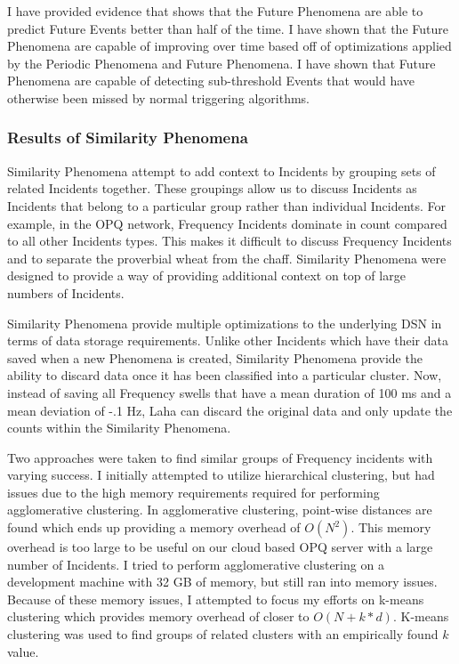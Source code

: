 I have provided evidence that shows that the Future Phenomena are able to predict Future Events better than half of the time. I have shown that the Future Phenomena are capable of improving over time based off of optimizations applied by the Periodic Phenomena and Future Phenomena. I have shown that Future Phenomena are capable of detecting sub-threshold Events that would have otherwise been missed by normal triggering algorithms.

\subsubsection{Results of Similarity Phenomena}

Similarity Phenomena attempt to add context to Incidents by grouping sets of related Incidents together. These groupings allow us to discuss Incidents as Incidents that belong to a particular group rather than individual Incidents. For example, in the OPQ network, Frequency Incidents dominate in count compared to all other Incidents types. This makes it difficult to discuss Frequency Incidents and to separate the proverbial wheat from the chaff. Similarity Phenomena were designed to provide a way of providing additional context on top of large numbers of Incidents.

Similarity Phenomena provide multiple optimizations to the underlying DSN in terms of data storage requirements. Unlike other Incidents which have their data saved when a new Phenomena is created, Similarity Phenomena provide the ability to discard data once it has been classified into a particular cluster. Now, instead of saving all Frequency swells that have a mean duration of 100 ms and a mean deviation of -.1 Hz, Laha can discard the original data and only update the counts within the Similarity Phenomena.

Two approaches were taken to find similar groups of Frequency incidents with varying success. I initially attempted to utilize hierarchical clustering\cite{johnson1967hierarchical}, but had issues due to the high memory requirements required for performing agglomerative clustering. In agglomerative clustering, point-wise distances are found which ends up providing a memory overhead of $O(N^2)$. This memory overhead is too large to be useful on our cloud based OPQ server with a large number of Incidents. I tried to perform agglomerative clustering on a development machine with 32 GB of memory, but still ran into memory issues. Because of these memory issues, I attempted to focus my efforts on k-means\cite{alsabti1997efficient} clustering which provides memory overhead of closer to $O(N + k * d)$. K-means clustering was used to find groups of related clusters with an empirically found $k$ value.

